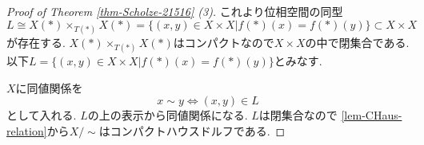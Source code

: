 \documentclass[dvipdfmx,a4paper,11pt]{article}
\theoremstyle{definition}
\newcommand{\xr}[1]{\textcolor{red}{#1}}
\begin{document}
\begin{proof}[Proof of Theorem \ref{thm-Scholze-21516} (3)]
\begin{comment}
よって次の図式を得る. ここで\xr{$\ast$代入は極限と可換なので(これは本当?presheafの直積とsheafの直積が可換かを見る!)} 左は直積なので右も直積となる.
$\underline{X} \times_{T} \underline{X} \cong \underline{L}$となる閉集合$L \subset X \times X$が存在する. 
\begin{equation*}
\xymatrix@C=80pt@R=30pt{
\underline{L}\ar@{->}[r]
\ar@{->}[d]
&\underline{X}\ar@{->}[d]^{f}
&L \ar@{->}[r]_{p_1}
\ar@{->}[d]_{p_2}
& X \ar@{->}[d]^{f(\ast)}
\\
\underline{X}\ar@{->}[r]_{f}
&T
&X \ar@{->}[r]_{f(\ast)}
&T(\ast)_{top} 
 \\   
}
\end{equation*}
ここで$L \subset X \times X$を
$$L = \{ (x,y) \in X \times X | f(\ast)(x) = f(\ast)(y)\} \subset X \times X$$
とおく. 
\ref{lem-eq-pullback}から
連続な全射
$$
W \to X \times_{T(\ast)} X  
$$ 
が存在する. 
よって
$L:=\{ (x,y) \in X \times X | f(\ast)(x) = f(\ast)(y)\}$とおくと, $L$
は$X \times X$のコンパクト集合となり, $X$コンパクトハウスドルフ空間のため, 閉集合となる. 
そこで$X$に同値関係を
$$
x \sim y \Leftrightarrow (x,y) \in L
$$
として入れる. ($L$の上の表示から同値関係は明らか)
そして
$$
\overline{f(\ast)} : X / \sim \to T(\ast)_{top}
$$
という連続写像がWell-definedである.
\ref{lem-CHaus-relation}から$X / \sim $はコンパクトハウスドルフである.
よって$\overline{f(\ast)} $が同相写像であることを示せば良い.
\end{comment}
これより位相空間の同型
$$
L \cong  X(\ast) \times_{T(\ast)} X(\ast)=  \{ (x,y) \in X \times X | f(\ast)(x) = f(\ast)(y)\} \subset X \times X
$$ 
が存在する. $X(\ast) \times_{T(\ast)} X(\ast)$はコンパクトなので$X \times X$の中で閉集合である. 
以下$L=\{ (x,y) \in X \times X | f(\ast)(x) = f(\ast)(y)\}$とみなす. 

$X$に同値関係を
$$
x \sim y \Leftrightarrow (x,y) \in L
$$
として入れる. $L$の上の表示から同値関係になる. 
$L$は閉集合なので
\ref{lem-CHaus-relation}から$X / \sim $はコンパクトハウスドルフである.
\begin{comment}
そして
$$
\overline{f(\ast)} : X / \sim \to T(\ast)_{top}
$$
という連続写像がWell-definedである.



よって$\overline{f(\ast)} $が同相写像であることを示せば良い.


\end{comment}
\end{proof}
\end{document}
